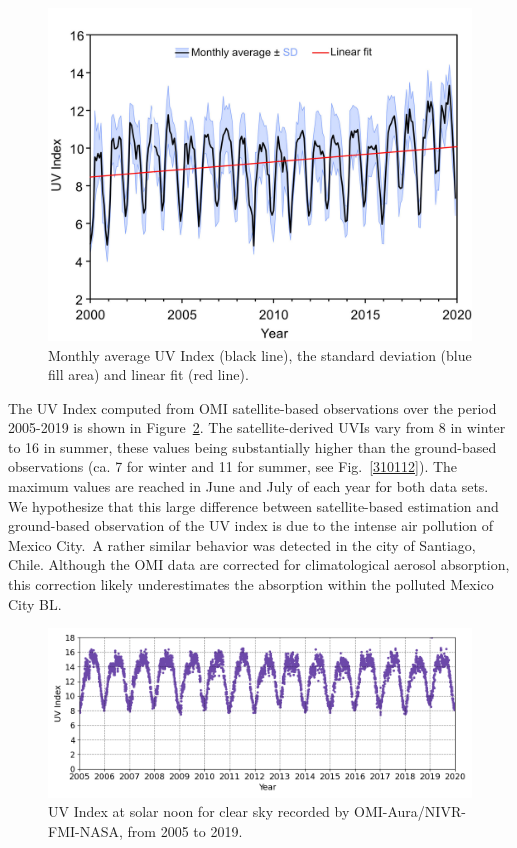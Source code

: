 \documentclass[journal=jacsat,manuscript=article]{achemso}
\begin{document}
\begin{figure}[H]
  \begin{center}
    \includegraphics[width=0.70\columnwidth]{figures/UV_Moving_Average}
    \caption{{Monthly
          average UV Index (black line), the standard deviation (blue fill area) and linear fit (red line).
            {\label{185758}}%
        }}
  \end{center}
\end{figure}

The UV Index computed from OMI satellite-based observations
over the period 2005-2019 is shown in
Figure~{\ref{485116}}. The satellite-derived UVIs vary
from 8 in winter to 16 in summer, these values being substantially higher
than the ground-based observations (ca. 7 for winter and 11 for summer,
see Fig.~{\ref{310112}}). The maximum values are reached in June and July of each year for both data sets.
We hypothesize that this large difference between satellite-based estimation and ground-based
observation of the UV index is due to the intense air pollution of
Mexico City.~A rather similar behavior was detected in the city of Santiago,
Chile.\citep{Cabrera_2012} Although the OMI data are corrected for climatological aerosol absorption\citep{Arola_2009}, this correction likely underestimates the absorption within the polluted Mexico City BL.


\begin{figure}[H]
  \begin{center}
    \includegraphics[width=0.75\columnwidth]{figures/CSUVindex}
    \caption{{UV Index at solar noon for clear sky recorded by OMI-Aura/NIVR-FMI-NASA,
          from 2005 to 2019.
            {\label{485116}}%
        }}
  \end{center}
\end{figure}
\end{document}
